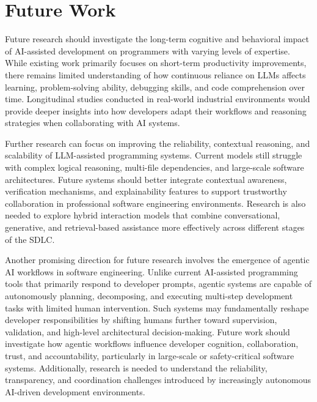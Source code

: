 \section{Future Work}
Future research should investigate the long-term cognitive and behavioral impact of AI-assisted development on programmers with varying levels of expertise. While existing work primarily focuses on short-term productivity improvements, there remains limited understanding of how continuous reliance on LLMs affects learning, problem-solving ability, debugging skills, and code comprehension over time. Longitudinal studies conducted in real-world industrial environments would provide deeper insights into how developers adapt their workflows and reasoning strategies when collaborating with AI systems.

Further research can focus on improving the reliability, contextual reasoning, and scalability of LLM-assisted programming systems. Current models still struggle with complex logical reasoning, multi-file dependencies, and large-scale software architectures. Future systems should better integrate contextual awareness, verification mechanisms, and explainability features to support trustworthy collaboration in professional software engineering environments. Research is also needed to explore hybrid interaction models that combine conversational, generative, and retrieval-based assistance more effectively across different stages of the SDLC.

Another promising direction for future research involves the emergence of agentic AI workflows in software engineering. Unlike current AI-assisted programming tools that primarily respond to developer prompts, agentic systems are capable of autonomously planning, decomposing, and executing multi-step development tasks with limited human intervention. Such systems may fundamentally reshape developer responsibilities by shifting humans further toward supervision, validation, and high-level architectural decision-making. Future work should investigate how agentic workflows influence developer cognition, collaboration, trust, and accountability, particularly in large-scale or safety-critical software systems. Additionally, research is needed to understand the reliability, transparency, and coordination challenges introduced by increasingly autonomous AI-driven development environments.
